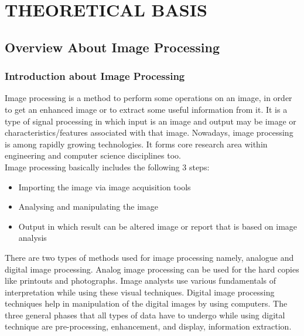 \chapter{THEORETICAL BASIS}

\renewcommand{\headrulewidth}{0.5pt}
\renewcommand{\footrulewidth}{0.5pt}
\thispagestyle{plain}
\pagestyle{fancy}
\fancyhf{}
\raggedright
{}

\section{Overview About Image Processing}
    \subsection{Introduction about Image Processing}
        Image processing is a method to perform some operations on an image, 
        in order to get an enhanced image or to extract some useful information from it. It is a type of signal 
        processing in which input is an image and output may be image or characteristics/features associated with 
        that image. Nowadays, image processing is among rapidly growing technologies. It forms core research area 
        within engineering and computer science disciplines too. \\ 
        \vspace{3mm}
        Image processing basically includes the following 3 steps:
        \begin{itemize}
            \item Importing the image via image acquisition tools
            \item Analysing and manipulating the image
            \item Output in which result can be altered image or report that is based on image analysis
        \end{itemize}
        There are two types of methods used for image processing namely, analogue and digital image processing. 
        Analog image processing can be used for the hard copies like printouts and photographs. Image analysts use 
        various fundamentals of interpretation while using these visual techniques. Digital image processing techniques 
        help in manipulation of the digital images by using computers. The three general phases that all types of data 
        have to undergo while using digital technique are pre-processing, enhancement, and display, information extraction.
